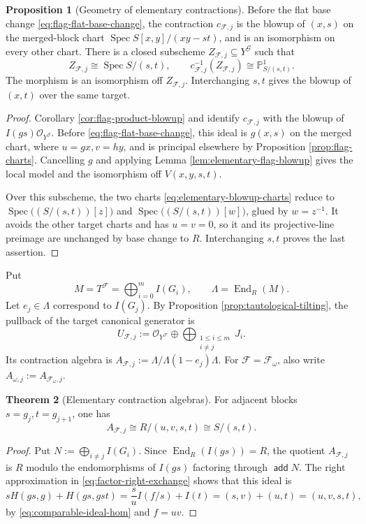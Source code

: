 \documentclass[a4paper,reqno]{amsart}
\def\F{\mathcal{F}}
\def\O{\mathcal{O}}
\DeclareMathOperator{\add}{\mathsf{add}}
\DeclareMathOperator{\End}{End}
\DeclareMathOperator{\Spec}{Spec}
\theoremstyle{definition}
\newtheorem{Thm}{Theorem}[section]
\newtheorem{Prop}[Thm]{Proposition}
\begin{document}
\begin{Prop}[Geometry of elementary contractions]\label{prop:elementary-contractions}
Before the flat base change \eqref{eq:flag-flat-base-change}, the contraction $c_{\F,j}$ is the blowup of $(x,s)$ on the merged-block chart $\Spec S[x,y]/(xy-st)$, and is an isomorphism on every other chart. There is a closed subscheme $Z_{\F,j}\subseteq Y^{\mathcal G}$ such that
\[
Z_{\F,j}\cong\Spec S/(s,t),\qquad
c_{\F,j}^{-1}(Z_{\F,j})\cong\mathbb P^1_{S/(s,t)}.
\]
The morphism is an isomorphism off $Z_{\F,j}$. Interchanging $s,t$ gives the blowup of $(x,t)$ over the same target.
\end{Prop}
\begin{proof}
Corollary \ref{cor:flag-product-blowup} and \cite[Tag 080A]{stacks-project} identify $c_{\F,j}$ with the blowup of $I(gs)\O_{Y^{\mathcal G}}$. Before \eqref{eq:flag-flat-base-change}, this ideal is $g(x,s)$ on the merged chart, where $u=gx,v=hy$, and is principal elsewhere by Proposition \ref{prop:flag-charts}. Cancelling $g$ and applying Lemma \ref{lem:elementary-flag-blowup} gives the local model and the isomorphism off $V(x,y,s,t)$.

Over this subscheme, the two charts \eqref{eq:elementary-blowup-charts} reduce to $\Spec\bigl((S/(s,t))[z]\bigr)$ and $\Spec\bigl((S/(s,t))[w]\bigr)$, glued by $w=z^{-1}$. It avoids the other target charts and has $u=v=0$, so it and its projective-line preimage are unchanged by base change to $R$. Interchanging $s,t$ proves the last assertion.
\end{proof}

Put
\[
M=T^\F=\bigoplus_{i=0}^m I(G_i),\qquad \Lambda=\End_R(M).
\]
Let $e_j\in\Lambda$ correspond to $I(G_j)$. By Proposition \ref{prop:tautological-tilting}, the pullback of the target canonical generator is
\[
U_{\F,j}:=\O_{Y^\F}\oplus\bigoplus_{\substack{1\le i\le m\\i\ne j}}J_i.
\]
Its contraction algebra is $A_{\F,j}:=\Lambda/\Lambda(1-e_j)\Lambda$. For $\F=\F_\omega$, also write $A_{\omega,j}:=A_{\F_\omega,j}$.

\begin{Thm}[Elementary contraction algebras]\label{thm:elementary-contraction-algebra}
For adjacent blocks $s=g_j,t=g_{j+1}$, one has
\begin{equation}\label{eq:elementary-contraction-algebra}
A_{\F,j}\cong R/(u,v,s,t)\cong S/(s,t).
\end{equation}
\end{Thm}
\begin{proof}
Put $N:=\bigoplus_{i\ne j}I(G_i)$. Since $\End_R(I(gs))=R$, the quotient $A_{\F,j}$ is $R$ modulo the endomorphisms of $I(gs)$ factoring through $\add N$. The right approximation in \eqref{eq:factor-right-exchange} shows that this ideal is
\[
sH(gs,g)+H(gs,gst)
=\frac{s}{u}I(f/s)+I(t)
=(s,v)+(u,t)=(u,v,s,t),
\]
by \eqref{eq:comparable-ideal-hom} and $f=uv$.
\end{proof}
\end{document}
